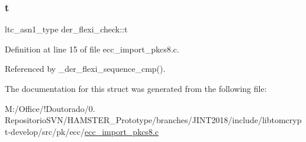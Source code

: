 \subsubsection{\texorpdfstring{t}{t}}
{\footnotesize\ttfamily ltc\+\_\+asn1\+\_\+type der\+\_\+flexi\+\_\+check\+::t}



Definition at line 15 of file ecc\+\_\+import\+\_\+pkcs8.\+c.



Referenced by \+\_\+der\+\_\+flexi\+\_\+sequence\+\_\+cmp().



The documentation for this struct was generated from the following file\+:\begin{DoxyCompactItemize}
\item 
M\+:/\+Office/!\+Doutorado/0. Repositorio\+S\+V\+N/\+H\+A\+M\+S\+T\+E\+R\+\_\+\+Prototype/branches/\+J\+I\+N\+T2018/include/libtomcrypt-\/develop/src/pk/ecc/\mbox{\hyperlink{ecc__import__pkcs8_8c}{ecc\+\_\+import\+\_\+pkcs8.\+c}}\end{DoxyCompactItemize}
